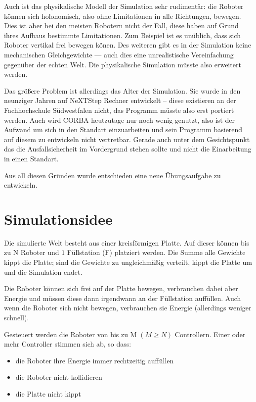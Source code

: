 Auch ist das physikalische Modell der Simulation sehr rudiment{\"{a}}r: die Roboter k{\"{o}}nnen sich holonomisch, also ohne Limitationen in alle Richtungen,
bewegen. Dies ist aber bei den meisten Robotern nicht der Fall, diese haben auf Grund ihres Aufbaus bestimmte Limitationen. Zum Beispiel ist es un{\"{u}}blich, dass sich
Roboter vertikal frei bewegen k{\"{o}}nen. Des weiteren gibt es in der Simulation keine mechanischen Gleichgewichte --- auch dies eine unrealistische
Vereinfachung gegen{\"{u}}ber der echten Welt. Die physikalische Simulation m{\"{u}}sste also erweitert werden.

Das gr{\"{o}}{\ss}ere Problem ist allerdings das Alter der Simulation. Sie wurde in den neunziger Jahren auf NeXTStep Rechner entwickelt -- diese existieren an der
Fachhochschule S{\"{u}}dwestfalen nicht, das Programm m{\"{u}}sste also erst portiert werden. Auch wird CORBA heutzutage nur noch wenig genutzt, also ist der Aufwand
um sich in den Standart einzuarbeiten und sein Programm basierend auf diesem zu entwickeln nicht vertretbar. Gerade auch unter dem Gesichtspunkt das die Ausfallsicherheit
im Vordergrund stehen sollte und nicht die Einarbeitung in einen Standart.

Aus all diesen Gr{\"{u}}nden wurde entschieden eine neue {\"{U}}bungsaufgabe zu entwickeln.

\clearpage
\section{Simulationsidee}
Die simulierte Welt besteht aus einer kreisf{\"{o}}rmigen Platte. Auf dieser k{\"{o}}nnen bis zu \gls{N} Roboter und $1$ F{\"{u}}llstation (\gls{F})
platziert werden. Die Summe alle Gewichte kippt die Platte; sind die Gewichte zu ungleichm{\"{a}}{\ss}ig verteilt, kippt
die Platte um und die Simulation endet.

Die Roboter k{\"{o}}nnen sich frei auf der Platte bewegen, verbrauchen dabei aber Energie und m{\"{u}}ssen diese dann irgendwann
an der F{\"{u}}llstation auff{\"{u}}llen. Auch wenn die Roboter sich nicht bewegen, verbrauchen sie Energie (allerdings weniger
schnell).

Gesteuert werden die Roboter von bis zu \gls{M} $(M \geq N)$ Controllern. Einer oder mehr Controller stimmen sich ab,
so dass:
\begin{itemize}
\item die Roboter ihre Energie immer rechtzeitig auff{\"{u}}llen
\item die Roboter nicht kollidieren
\item die Platte nicht kippt
\end{itemize}

